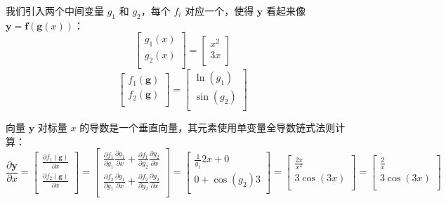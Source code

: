 \documentclass[11pt]{article}
\begin{document}
我们引入两个中间变量 \(g_1\) 和 \(g_2\)，每个 \(f_i\) 对应一个，使得 \(\mathbf{y}\) 看起来像 \(\mathbf{y} = \mathbf{f}(\mathbf{g}(x))\)：
\[
\begin{bmatrix}
g_1(x)\\
g_2(x)\\
\end{bmatrix} = \begin{bmatrix}
x^2\\
3x\\
\end{bmatrix}
\]
\[
\begin{bmatrix}
f_1(\mathbf{g})\\
f_2(\mathbf{g})\\
\end{bmatrix} = \begin{bmatrix}
\ln(g_1)\\
\sin(g_2)\\
\end{bmatrix}
\]

向量 \(\mathbf{y}\) 对标量 \(x\) 的导数是一个垂直向量，其元素使用单变量全导数链式法则计算：
\[
\frac{\partial \mathbf{y}}{\partial x}  =
\begin{bmatrix}
\frac{\partial f_1(\mathbf{g})}{\partial x}\\
\frac{\partial f_2(\mathbf{g})}{\partial x}\\
\end{bmatrix} = \begin{bmatrix}
\frac{\partial f_1}{\partial g_1}\frac{\partial g_1}{\partial x} + \frac{\partial f_1}{\partial g_2}\frac{\partial g_2}{\partial x}\\
\frac{\partial f_2}{\partial g_1}\frac{\partial g_1}{\partial x} + \frac{\partial f_2}{\partial g_2}\frac{\partial g_2}{\partial x}\\
\end{bmatrix} = \begin{bmatrix}
\frac{1}{g_1}2x + 0\\
0 + \cos(g_2)3\\
\end{bmatrix} = \begin{bmatrix}
\frac{2x}{x^2}\\
3\cos(3x)\\
\end{bmatrix} = \begin{bmatrix}
\frac{2}{x}\\
3\cos(3x)\\
\end{bmatrix}
\]
\end{document}
